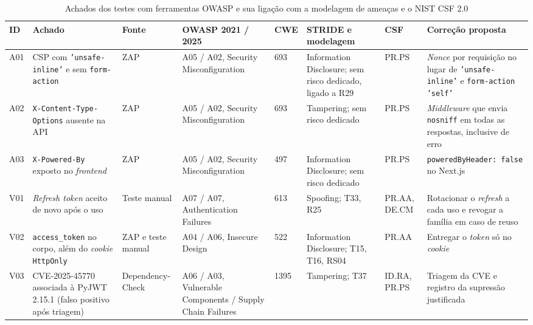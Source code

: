 \documentclass[conference]{IEEEtran}
\begin{document}
\begin{table}[!t]
\centering
\caption{Achados dos testes com ferramentas OWASP e sua ligação com a modelagem de ameaças e o NIST CSF 2.0}
\label{tab:owasp-achados}
\footnotesize
\renewcommand{\arraystretch}{1.15}
\setlength{\tabcolsep}{4pt}
\begin{tabularx}{\textwidth}{@{}l >{\raggedright\arraybackslash}p{2.7cm} >{\raggedright\arraybackslash}p{1.5cm} >{\raggedright\arraybackslash}p{2.5cm} l >{\raggedright\arraybackslash}p{2.2cm} >{\raggedright\arraybackslash}p{1.2cm} Y@{}}
\hline
\textbf{ID} & \textbf{Achado} & \textbf{Fonte} & \textbf{OWASP 2021 / 2025} & \textbf{CWE} & \textbf{STRIDE e modelagem} & \textbf{CSF} & \textbf{Correção proposta} \\
\hline
A01 & CSP com \texttt{'unsafe-inline'} e sem \texttt{form-action} & ZAP & A05 / A02, Security Misconfiguration & 693 & Information Disclosure; sem risco dedicado, ligado a R29 & PR.PS & \textit{Nonce} por requisição no lugar de \texttt{'unsafe-inline'} e \texttt{form-action 'self'} \\
A02 & \texttt{X-Content-Type-Options} ausente na API & ZAP & A05 / A02, Security Misconfiguration & 693 & Tampering; sem risco dedicado & PR.PS & \textit{Middleware} que envia \texttt{nosniff} em todas as respostas, inclusive de erro \\
A03 & \texttt{X-Powered-By} exposto no \textit{frontend} & ZAP & A05 / A02, Security Misconfiguration & 497 & Information Disclosure; sem risco dedicado & PR.PS & \texttt{poweredByHeader: false} no Next.js \\
V01 & \textit{Refresh token} aceito de novo após o uso & Teste manual & A07 / A07, Authentication Failures & 613 & Spoofing; T33, R25 & PR.AA, DE.CM & Rotacionar o \textit{refresh} a cada uso e revogar a família em caso de reuso \\
V02 & \texttt{access\_token} no corpo, além do \textit{cookie} \texttt{HttpOnly} & ZAP e teste manual & A04 / A06, Insecure Design & 522 & Information Disclosure; T15, T16, RS04 & PR.AA & Entregar o \textit{token} só no \textit{cookie} \\
V03 & CVE-2025-45770 associada à PyJWT 2.15.1 (falso positivo após triagem) & Dependency-Check & A06 / A03, Vulnerable Components / Supply Chain Failures & 1395 & Tampering; T37 & ID.RA, PR.PS & Triagem da CVE e registro da supressão justificada \\
\hline
\end{tabularx}
\end{table}
\end{document}
